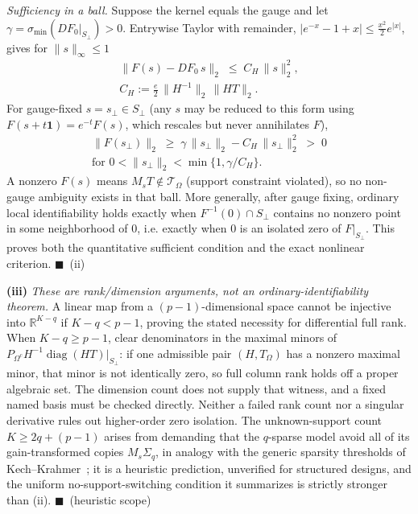 \emph{Sufficiency in a ball.} Suppose the kernel equals the gauge and let $\gamma = \sigma_{\min}(DF_0|_{S_\perp}) > 0$. Entrywise Taylor with remainder, $|e^{-x} - 1 + x| \le \tfrac{x^2}{2}e^{|x|}$, gives for $\lVert s\rVert_\infty \le 1$
\[
\begin{gathered}
\lVert F(s) - DF_0\,s\rVert_2 \;\le\; C_H\,\lVert s\rVert_2^2,\\
C_H := \tfrac{e}{2}\,\lVert H^{-1}\rVert_2\,\lVert HT\rVert_2 .
\end{gathered}
\]
For gauge-fixed $s = s_\perp \in S_\perp$ (any $s$ may be reduced to this form using $F(s + t\mathbf 1) = e^{-t}F(s)$, which rescales but never annihilates $F$),
\[
\begin{gathered}
\lVert F(s_\perp)\rVert_2 \;\ge\; \gamma\,\lVert s_\perp\rVert_2 - C_H\,\lVert s_\perp\rVert_2^2 \;>\; 0\\
\text{for } 0 < \lVert s_\perp\rVert_2 < \min\{1,\gamma/C_H\} .
\end{gathered}
\]
A nonzero $F(s)$ means $M_sT \notin \mathcal T_\Omega$ (support constraint violated), so no non-gauge ambiguity exists in that ball. More generally, after gauge fixing, ordinary local identifiability holds exactly when $F^{-1}(0)\cap S_\perp$ contains no nonzero point in some neighborhood of $0$, i.e. exactly when $0$ is an isolated zero of $F|_{S_\perp}$. This proves both the quantitative sufficient condition and the exact nonlinear criterion. \hfill$\blacksquare$\ \textnormal{(ii)}

\textbf{(iii)} \emph{These are rank/dimension arguments, not an ordinary-identifiability theorem.} A linear map from a $(p-1)$-dimensional space cannot be injective into $\mathbb{R}^{K-q}$ if $K-q<p-1$, proving the stated necessity for differential full rank. When $K-q\ge p-1$, clear denominators in the maximal minors of $P_{\Omega^c}H^{-1}\operatorname{diag}(HT)|_{S_\perp}$: if one admissible pair $(H,T_\Omega)$ has a nonzero maximal minor, that minor is not identically zero, so full column rank holds off a proper algebraic set. The dimension count does not supply that witness, and a fixed named basis must be checked directly. Neither a failed rank count nor a singular derivative rules out higher-order zero isolation. The unknown-support count $K \ge 2q + (p-1)$ arises from demanding that the $q$-sparse model avoid all of its gain-transformed copies $M_s\Sigma_q$, in analogy with the generic sparsity thresholds of Kech--Krahmer~\cite{KechKrahmer1603.07316}; it is a heuristic prediction, unverified for structured designs, and the uniform no-support-switching condition it summarizes is strictly stronger than (ii). \hfill$\blacksquare$\ \textnormal{(heuristic scope)}

